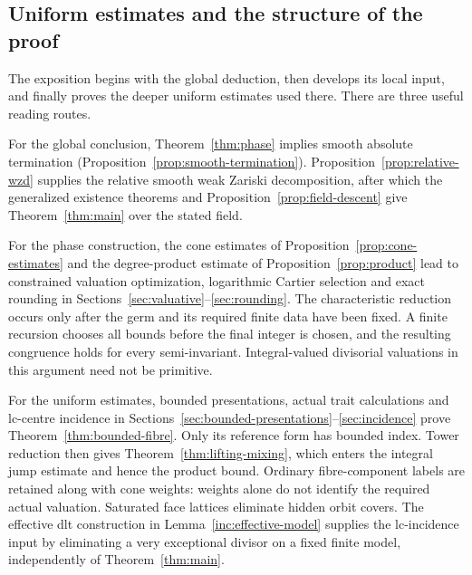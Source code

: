 \subsection{Uniform estimates and the structure of the proof}

The exposition begins with the global deduction, then develops its local
input, and finally proves the deeper uniform estimates used there.
There are three useful reading routes.

For the global conclusion, Theorem~\ref{thm:phase} implies smooth
absolute termination (Proposition~\ref{prop:smooth-termination}).
Proposition~\ref{prop:relative-wzd} supplies the relative smooth
weak Zariski decomposition, after which the generalized existence
theorems and Proposition~\ref{prop:field-descent} give
Theorem~\ref{thm:main} over the stated field.

For the phase construction, the cone estimates of
Proposition~\ref{prop:cone-estimates} and the degree-product estimate
of Proposition~\ref{prop:product} lead to constrained valuation
optimization, logarithmic Cartier selection and exact rounding in
Sections~\ref{sec:valuative}--\ref{sec:rounding}. The characteristic
reduction occurs only after the germ and its required finite data have
been fixed. A finite recursion chooses all bounds before the final
integer is chosen, and the resulting congruence holds for every
semi-invariant. Integral-valued divisorial valuations in this argument
need not be primitive.

For the uniform estimates, bounded presentations, actual trait
calculations and lc-centre incidence in
Sections~\ref{sec:bounded-presentations}--\ref{sec:incidence} prove
Theorem~\ref{thm:bounded-fibre}. Only its reference form has bounded
index. Tower reduction then gives Theorem~\ref{thm:lifting-mixing},
which enters the integral jump estimate and hence the product bound.
Ordinary fibre-component labels are retained along with cone weights:
weights alone do not identify the required actual valuation. Saturated
face lattices eliminate hidden orbit covers. The effective dlt
construction in Lemma~\ref{inc:effective-model} supplies the lc-incidence
input by eliminating a very exceptional divisor on a fixed finite
model, independently of Theorem~\ref{thm:main}.

